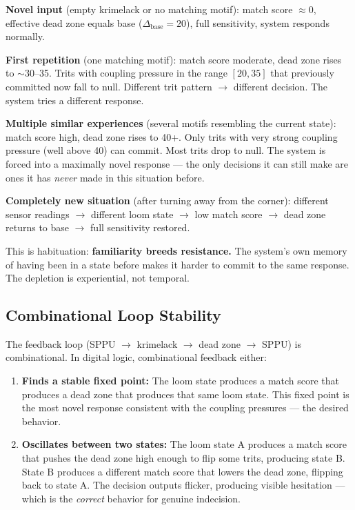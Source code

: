 \documentclass[11pt,a4paper]{article}
\begin{document}
\textbf{Novel input} (empty krimelack or no matching motif): match score $\approx 0$, effective dead zone equals base ($\Delta_{\text{base}} = 20$), full sensitivity, system responds normally.

\textbf{First repetition} (one matching motif): match score moderate, dead zone rises to $\sim$30--35. Trits with coupling pressure in the range $[20, 35]$ that previously committed now fall to null. Different trit pattern $\rightarrow$ different decision. The system tries a different response.

\textbf{Multiple similar experiences} (several motifs resembling the current state): match score high, dead zone rises to 40+. Only trits with very strong coupling pressure (well above 40) can commit. Most trits drop to null. The system is forced into a maximally novel response --- the only decisions it can still make are ones it has \textit{never} made in this situation before.

\textbf{Completely new situation} (after turning away from the corner): different sensor readings $\rightarrow$ different loom state $\rightarrow$ low match score $\rightarrow$ dead zone returns to base $\rightarrow$ full sensitivity restored.

This is habituation: \textbf{familiarity breeds resistance.} The system's own memory of having been in a state before makes it harder to commit to the same response. The depletion is experiential, not temporal.

\subsection{Combinational Loop Stability}

The feedback loop (SPPU $\rightarrow$ krimelack $\rightarrow$ dead zone $\rightarrow$ SPPU) is combinational. In digital logic, combinational feedback either:

\begin{enumerate}
    \item \textbf{Finds a stable fixed point:} The loom state produces a match score that produces a dead zone that produces that same loom state. This fixed point is the most novel response consistent with the coupling pressures --- the desired behavior.

    \item \textbf{Oscillates between two states:} The loom state A produces a match score that pushes the dead zone high enough to flip some trits, producing state B. State B produces a different match score that lowers the dead zone, flipping back to state A. The decision outputs flicker, producing visible hesitation --- which is the \textit{correct} behavior for genuine indecision.
\end{enumerate}
\end{document}
